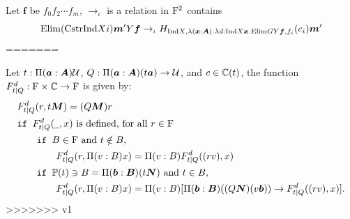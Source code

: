 \begin{definition}
  Let $\bm f$ be $f_0f_2\cdots f_m$, $\rightarrow_{\iota}$ is a relation in $\mathrm{F}^2$ contains
  \[
  \mathrm{Elim} (\mathrm{Cstr} \mathrm{Ind} X i) \boldsymbol{m}' Y \boldsymbol{f} \rightarrow_{\iota} H_{\mathrm{Ind} X, \lambda(\boldsymbol{x} : \boldsymbol{A}). \lambda d : \mathrm{Ind} X \boldsymbol{x} . \mathrm{Elim} G Y \boldsymbol{f} , f_i } (c_i)\boldsymbol{m}'
  \]
=======
\begin{definition}
  Let $t : \Pi(\boldsymbol{a} : \boldsymbol{A}) \mathcal{U}$, $Q : \Pi(\boldsymbol{a} : \boldsymbol{A}) (t \boldsymbol{a}) \rightarrow \mathcal{U}$, and $c \in \mathbb{C}(t)$, the function $F^{d}_{t|Q}:\mathrm{F} \times \mathbb{C} \to \mathrm{F}$ is given by:
  \begin{align*}
    & F^{d}_{t|Q} (r, t \boldsymbol{M}) = (Q \boldsymbol{M})r \\
    & \texttt{if } F^{d}_{t|Q} (\mathord{\underline{\hspace{0.5em}}}, x) \text{ is defined, for all } r \in \mathrm{F} \\
    & \qquad \texttt{if } B \in \mathrm{F}\text{ and } t \notin B, \\
    & \qquad \qquad F^{d}_{t|Q} (r, \Pi(v : B) x) = \Pi(v : B) F^{d}_{t|Q}((r v), x) \\
    & \qquad  \texttt{if } \mathbb{P}(t) \ni B = \Pi(\boldsymbol{b}: \boldsymbol{B})(t \boldsymbol{N}) \text{ and } t \in B,\\ 
    & \qquad \qquad F^{d}_{t|Q}(r, \Pi(v : B) x) = \Pi(v : B)[\Pi(\boldsymbol{b} : \boldsymbol{B})((Q \boldsymbol{N}) (v \boldsymbol{b})) \rightarrow  F^{d}_{t|Q}((r v), x) ].
  \end{align*}
>>>>>>> v1
\end{definition}








\end{definition}

